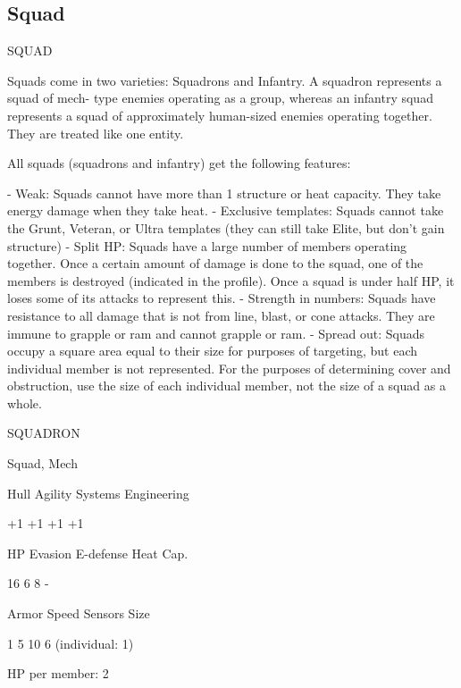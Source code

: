 \subsection{Squad}

                                                 SQUAD   

Squads come in two varieties: Squadrons and Infantry. A squadron represents a squad of mech- 
type enemies operating as a group, whereas an infantry squad represents a squad of  
approximately human-sized enemies operating together. They are treated like one entity.
 

All squads (squadrons and infantry) get the following features:
 
    -   Weak: Squads cannot have more than 1 structure or heat capacity. They take energy  
        damage when they take heat.  
    -   Exclusive templates: Squads cannot take the Grunt, Veteran, or Ultra templates (they  
        can still take Elite, but don’t gain structure)  
    -   Split HP: Squads have a large number of members operating together. Once a certain  
        amount of damage is done to the squad, one of the members is destroyed (indicated in  
        the profile). Once a squad is under half HP, it loses some of its attacks to represent this.  
    -   Strength in numbers: Squads have resistance to all damage that is not from line, blast,  
        or cone attacks. They are immune to grapple or ram and cannot grapple or ram.  
    -   Spread out: Squads occupy a square area equal to their size for purposes of targeting,  
        but each individual member is not represented. For the purposes of determining cover  
        and obstruction, use the size of each individual member, not the size of a squad as a  
        whole.  

       SQUADRON 

       Squad, Mech 

       Hull       Agility     Systems       Engineering 

       +1         +1          +1            +1 

       HP         Evasion     E-defense     Heat Cap. 

       16         6           8             - 

       Armor      Speed       Sensors       Size 

       1          5           10            6 (individual:  
                                            1) 

HP per member: 2
 
